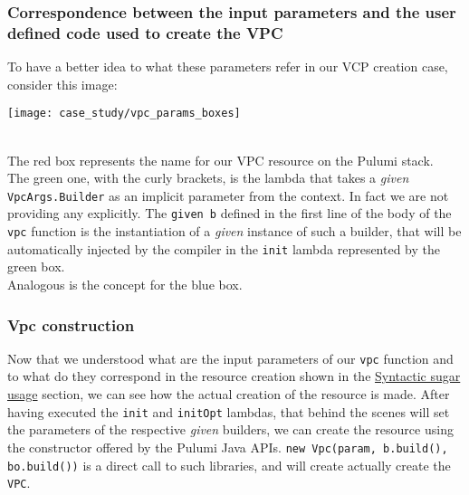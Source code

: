\subsubsection{Correspondence between the input parameters and the user defined code used to create the VPC}
To have a better idea to what these parameters refer in our VCP creation case, consider this image:
\begin{center}
  \texttt{[image: case\_study/vpc\_params\_boxes]} 
\end{center}\mbox{}\\
The red box represents the name for our VPC resource on the Pulumi stack.\\
The green one, with the curly brackets, is the lambda that takes a \textit{given} \texttt{VpcArgs.Builder} as an implicit parameter from the context.
In fact we are not providing any explicitly.
The \texttt{given b} defined in the first line of the body of the \texttt{vpc} function is the instantiation of a \textit{given} instance of such a builder, that will be automatically injected by the compiler in the \texttt{init} lambda represented by the green box.\\
Analogous is the concept for the blue box.\\

\subsubsection{Vpc construction}
Now that we understood what are the input parameters of our \texttt{vpc} function and to what do they correspond in the resource creation shown in the \hyperref[ssec:syn-sug-usage]{Syntactic sugar usage} section, we can see how the actual creation of the resource is made.
After having executed the \texttt{init} and \texttt{initOpt} lambdas, that behind the scenes will set the parameters of the respective \textit{given} builders, we can create the resource using the constructor offered by the Pulumi Java APIs.
\texttt{new Vpc(param, b.build(), bo.build())} is a direct call to such libraries, and will create actually create the \texttt{VPC}.


